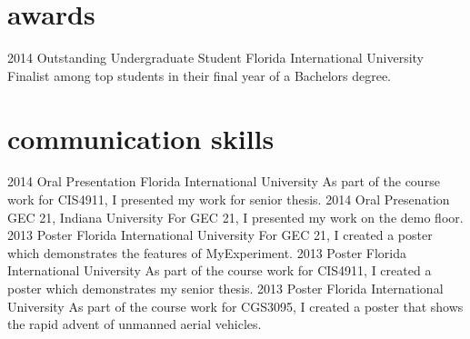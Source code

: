 \documentclass[]{friggeri-cv} %
\begin{document}

\section{awards}
\begin{entrylist}
\entry
{2014}
{Outstanding Undergraduate Student}
{Florida International University}
{Finalist among top students in their final year of a Bachelors degree.}
\end{entrylist}

\clearpage
\section{communication skills}
\begin{entrylist}
\entry
{2014}
{Oral Presentation}
{Florida International University}
{As part of the course work for CIS4911, I presented my work for senior thesis.}
\entry
{2014}
{Oral Presenation}
{GEC 21, Indiana University}
{For GEC 21, I presented my work on the demo floor.}
\entry
{2013}
{Poster}
{Florida International University}
{For GEC 21, I created a poster which demonstrates the features of MyExperiment.}
\entry
{2013}
{Poster}
{Florida International University}
{As part of the course work for CIS4911, I created a poster which demonstrates my senior thesis.}
\entry
{2013}
{Poster}
{Florida International University}
{As part of the course work for CGS3095, I created a poster that shows the rapid advent of unmanned aerial vehicles.}
\end{entrylist}

\end{document}
